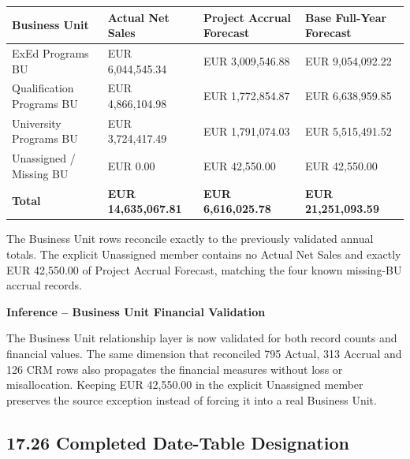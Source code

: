\documentclass[11pt,a4paper]{article}
\begin{document}
\begin{tabularx}{\textwidth}{
    >{\raggedright\arraybackslash}p{4.2cm}
    >{\raggedleft\arraybackslash}p{3.2cm}
    >{\raggedleft\arraybackslash}p{3.2cm}
    >{\raggedleft\arraybackslash}X
}

\toprule

Business Unit
&
Actual Net Sales
&
Project Accrual Forecast
&
Base Full-Year Forecast
\\

\midrule

ExEd Programs BU
&
EUR 6,044,545.34
&
EUR 3,009,546.88
&
EUR 9,054,092.22
\\

Qualification Programs BU
&
EUR 4,866,104.98
&
EUR 1,772,854.87
&
EUR 6,638,959.85
\\

University Programs BU
&
EUR 3,724,417.49
&
EUR 1,791,074.03
&
EUR 5,515,491.52
\\

Unassigned / Missing BU
&
EUR 0.00
&
EUR 42,550.00
&
EUR 42,550.00
\\

\midrule

\textbf{Total}
&
\textbf{EUR 14,635,067.81}
&
\textbf{EUR 6,616,025.78}
&
\textbf{EUR 21,251,093.59}
\\

\bottomrule

\end{tabularx}

The Business Unit rows reconcile exactly to the previously validated annual
totals. The explicit Unassigned member contains no Actual Net Sales and exactly
EUR 42,550.00 of Project Accrual Forecast, matching the four known missing-BU
accrual records.

\begin{inferencebox}

\textbf{Inference -- Business Unit Financial Validation}

The Business Unit relationship layer is now validated for both record counts
and financial values. The same dimension that reconciled 795 Actual, 313
Accrual and 126 CRM rows also propagates the financial measures without loss or
misallocation. Keeping EUR 42,550.00 in the explicit Unassigned member preserves
the source exception instead of forcing it into a real Business Unit.

\end{inferencebox}

\subsection{17.26 Completed Date-Table Designation}
\end{document}
